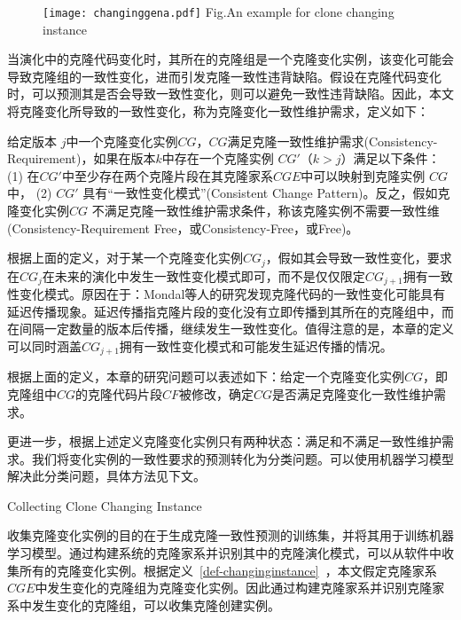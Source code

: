\begin{figure}[htbp]
\centering
\texttt{[image: changinggena.pdf]}
{Fig.$\!$}{An example for clone changing instance}
\vspace{-1em}
\end{figure}

当演化中的克隆代码变化时，其所在的克隆组是一个克隆变化实例，该变化可能会导致克隆组的一致性变化，进而引发克隆一致性违背缺陷。假设在克隆代码变化时，可以预测其是否会导致一致性变化，则可以避免一致性违背缺陷。因此，本文将克隆变化所导致的一致性变化，称为克隆变化一致性维护需求，定义如下：

\begin{definition}[克隆变化一致性维护需求] 
 \label{def-changingrequirement}
给定版本 $j$中一个克隆变化实例$CG$，$CG$满足克隆一致性维护需求(Consistency-Requirement)，如果在版本$k$中存在一个克隆实例 $CG'$（$k>j$）满足以下条件： (1) 在$CG'$中至少存在两个克隆片段在其克隆家系$CGE$中可以映射到克隆实例 $CG$中， (2) $CG'$ 具有“一致性变化模式”(Consistent Change Pattern)。反之，假如克隆变化实例$CG$ 不满足克隆一致性维护需求条件，称该克隆实例不需要一致性维(Consistency-Requirement Free，或Consistency-Free，或Free)。
\end{definition}

根据上面的定义，对于某一个克隆变化实例$CG_j$，假如其会导致一致性变化，要求在$CG_j$在未来的演化中发生一致性变化模式即可，而不是仅仅限定$CG_{j+1}$拥有一致性变化模式。原因在于：Mondal等人的研究发现克隆代码的一致性变化可能具有延迟传播现象。延迟传播指克隆片段的变化没有立即传播到其所在的克隆组中，而在间隔一定数量的版本后传播，继续发生一致性变化\cite{mondal2016comparative}。值得注意的是，本章的定义可以同时涵盖$CG_{j+1}$拥有一致性变化模式和可能发生延迟传播的情况。

根据上面的定义，本章的研究问题可以表述如下：给定一个克隆变化实例$CG$，即克隆组中$CG$的克隆代码片段$CF$被修改，确定$CG$是否满足克隆变化一致性维护需求。

更进一步，根据上述定义克隆变化实例只有两种状态：满足和不满足一致性维护需求。我们将变化实例的一致性要求的预测转化为分类问题。可以使用机器学习模型解决此分类问题，具体方法见下文。

{Collecting Clone Changing Instance}

收集克隆变化实例的目的在于生成克隆一致性预测的训练集，并将其用于训练机器学习模型。通过构建系统的克隆家系并识别其中的克隆演化模式，可以从软件中收集所有的克隆变化实例。根据定义~\ref{def-changinginstance}~，本文假定克隆家系$CGE$中发生变化的克隆组为克隆变化实例。因此通过构建克隆家系并识别克隆家系中发生变化的克隆组，可以收集克隆创建实例。

